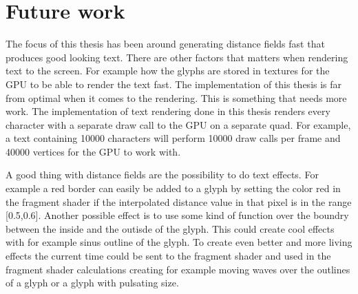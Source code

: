 \chapter{Future work}\label{cha:conclusions}
The focus of this thesis has been around generating distance fields fast that produces good looking text. There are other factors that matters when rendering text to the screen. For example how the glyphs are stored in textures for the GPU to be able to render the text fast. The implementation of this thesis is far from optimal when it comes to the rendering. This is something that needs more work. The implementation of text rendering done in this thesis renders every character with a separate draw call to the GPU on a separate quad. For example, a text containing 10000 characters will perform 10000 draw calls per frame and 40000 vertices for the GPU to work with.

A good thing with distance fields are the possibility to do text effects. For example a red border can easily be added to a glyph by setting the color red in the fragment shader if the interpolated distance value in that pixel is in the range [0.5,0.6]. Another possible effect is to use some kind of function over the boundry between the inside and the outisde of the glyph. This could create cool effects with for example sinus outline of the glyph. To create even better and more living effects the current time could be sent to the fragment shader and used in the fragment shader calculations creating for example moving waves over the outlines of a glyph or a glyph with pulsating size.